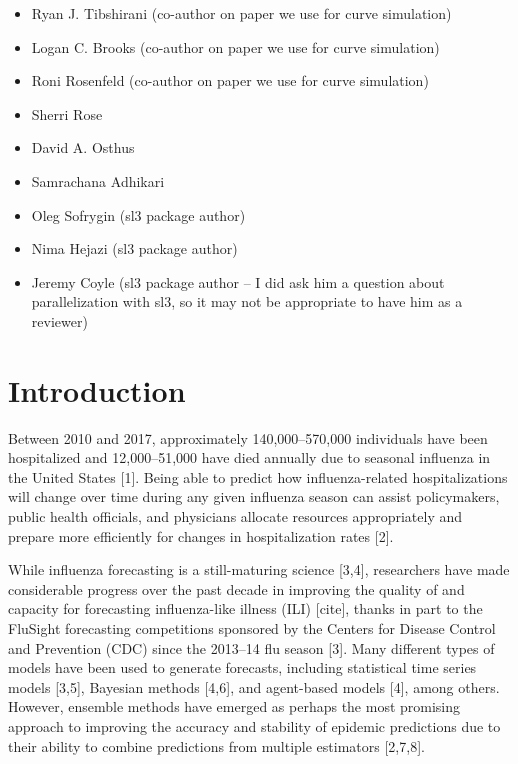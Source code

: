 \documentclass[10pt,letterpaper]{article}
\providecommand{\tightlist}{%
  \setlength{\itemsep}{0pt}\setlength{\parskip}{0pt}}
\begin{document}
\begin{itemize}
\tightlist
\item
  Ryan J. Tibshirani (co-author on paper we use for curve simulation)
\item
  Logan C. Brooks (co-author on paper we use for curve simulation)
\item
  Roni Rosenfeld (co-author on paper we use for curve simulation)
\item
  Sherri Rose
\item
  David A. Osthus
\item
  Samrachana Adhikari
\item
  Oleg Sofrygin (sl3 package author)
\item
  Nima Hejazi (sl3 package author)
\item
  Jeremy Coyle (sl3 package author -- I did ask him a question about
  parallelization with sl3, so it may not be appropriate to have him as
  a reviewer)
\end{itemize}

\hypertarget{introduction}{%
\section{Introduction}\label{introduction}}

Between 2010 and 2017, approximately 140,000--570,000 individuals have
been hospitalized and 12,000--51,000 have died annually due to seasonal
influenza in the United States {[}1{]}. Being able to predict how
influenza-related hospitalizations will change over time during any
given influenza season can assist policymakers, public health officials,
and physicians allocate resources appropriately and prepare more
efficiently for changes in hospitalization rates {[}2{]}.

While influenza forecasting is a still-maturing science {[}3,4{]},
researchers have made considerable progress over the past decade in
improving the quality of and capacity for forecasting influenza-like
illness (ILI) {[}cite{]}, thanks in part to the FluSight forecasting
competitions sponsored by the Centers for Disease Control and Prevention
(CDC) since the 2013--14 flu season {[}3{]}. Many different types of
models have been used to generate forecasts, including statistical time
series models {[}3,5{]}, Bayesian methods {[}4,6{]}, and agent-based
models {[}4{]}, among others. However, ensemble methods have emerged as
perhaps the most promising approach to improving the accuracy and
stability of epidemic predictions due to their ability to combine
predictions from multiple estimators {[}2,7,8{]}.
\end{document}
